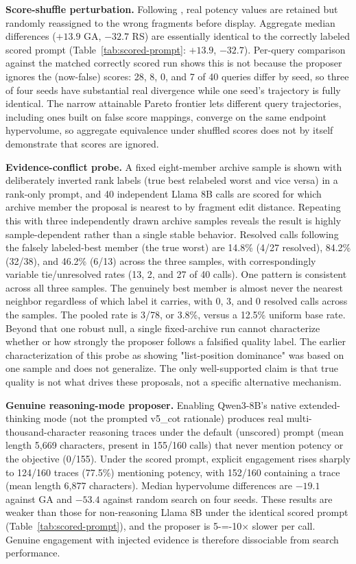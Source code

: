 \documentclass[11pt]{article}
\begin{document}
\textbf{Score-shuffle perturbation.} Following \citet{fang2026bioreasoninputs}, real potency values are retained but randomly reassigned to the wrong fragments before display. Aggregate median differences ($+13.9$ GA, $-32.7$ RS) are essentially identical to the correctly labeled scored prompt (Table~\ref{tab:scored-prompt}: $+13.9$, $-32.7$). Per-query comparison against the matched correctly scored run shows this is not because the proposer ignores the (now-false) scores: 28, 8, 0, and 7 of 40 queries differ by seed, so three of four seeds have substantial real divergence while one seed's trajectory is fully identical. The narrow attainable Pareto frontier lets different query trajectories, including ones built on false score mappings, converge on the same endpoint hypervolume, so aggregate equivalence under shuffled scores does not by itself demonstrate that scores are ignored.

\textbf{Evidence-conflict probe.} A fixed eight-member archive sample is shown with deliberately inverted rank labels (true best relabeled worst and vice versa) in a rank-only prompt, and 40 independent Llama 8B calls are scored for which archive member the proposal is nearest to by fragment edit distance. Repeating this with three independently drawn archive samples reveals the result is highly sample-dependent rather than a single stable behavior. Resolved calls following the falsely labeled-best member (the true worst) are 14.8\% (4/27 resolved), 84.2\% (32/38), and 46.2\% (6/13) across the three samples, with correspondingly variable tie/unresolved rates (13, 2, and 27 of 40 calls). One pattern is consistent across all three samples. The genuinely best member is almost never the nearest neighbor regardless of which label it carries, with 0, 3, and 0 resolved calls across the samples. The pooled rate is 3/78, or 3.8\%, versus a 12.5\% uniform base rate. Beyond that one robust null, a single fixed-archive run cannot characterize whether or how strongly the proposer follows a falsified quality label. The earlier characterization of this probe as showing "list-position dominance" was based on one sample and does not generalize. The only well-supported claim is that true quality is not what drives these proposals, not a specific alternative mechanism.

\textbf{Genuine reasoning-mode proposer.} Enabling Qwen3-8B's native extended-thinking mode (not the prompted \mbox{v5\_cot} rationale) produces real multi-thousand-character reasoning traces under the default (unscored) prompt (mean length 5,669 characters, present in 155/160 calls) that never mention potency or the objective (0/155). Under the scored prompt, explicit engagement rises sharply to 124/160 traces (77.5\%) mentioning potency, with 152/160 containing a trace (mean length 6,877 characters). Median hypervolume differences are $-19.1$ against GA and $-53.4$ against random search on four seeds. These results are weaker than those for non-reasoning Llama 8B under the identical scored prompt (Table~\ref{tab:scored-prompt}), and the proposer is 5-=-10$\times$ slower per call. Genuine engagement with injected evidence is therefore dissociable from search performance.
\end{document}
